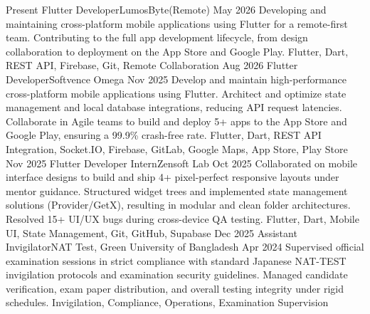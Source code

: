 \documentclass[localFont,alternative,monochrome]{documentMETADATA}
\begin{document}
	\begin{experiences}
	  \experience
	    {Present}   {Flutter Developer}{LumosByte}{(Remote)}
	    {May 2026}      {
	                      Developing and maintaining cross-platform mobile applications using Flutter for a remote-first team. Contributing to the full app development lifecycle, from design collaboration to deployment on the App Store and Google Play.
	                    }
	                    {Flutter, Dart, REST API, Firebase, Git, Remote Collaboration}
	  \emptySeparator
	  \experience
	    {Aug 2026}   {Flutter Developer}{Softvence Omega}{}
	    {Nov 2025}      {
	                      Develop and maintain high-performance cross-platform mobile applications using Flutter. Architect and optimize state management and local database integrations, reducing API request latencies. Collaborate in Agile teams to build and deploy 5+ apps to the App Store and Google Play, ensuring a 99.9\% crash-free rate.
	                    }
	                    {Flutter, Dart, REST API Integration, Socket.IO, Firebase, GitLab, Google Maps, App Store, Play Store}
	  \emptySeparator
	  \experience
	    {Nov 2025}      {Flutter Developer Intern}{Zensoft Lab}{}
	    {Oct 2025}      {
	                      Collaborated on mobile interface designs to build and ship 4+ pixel-perfect responsive layouts under mentor guidance. Structured widget trees and implemented state management solutions (Provider/GetX), resulting in modular and clean folder architectures. Resolved 15+ UI/UX bugs during cross-device QA testing.
	                    }
	                    {Flutter, Dart, Mobile UI, State Management, Git, GitHub, Supabase}
	  \emptySeparator
	  \experience
	    {Dec 2025}      {Assistant Invigilator}{NAT Test, Green University of Bangladesh}{}
	    {Apr 2024}      {
	                      Supervised official examination sessions in strict compliance with standard Japanese NAT-TEST invigilation protocols and examination security guidelines. Managed candidate verification, exam paper distribution, and overall testing integrity under rigid schedules.
	                    }
	                    {Invigilation, Compliance, Operations, Examination Supervision}
	\end{experiences}
\end{document}
